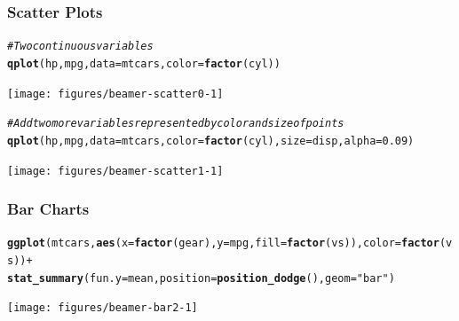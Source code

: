 \documentclass{beamer}\usepackage[]{graphicx}\usepackage[]{color}
\makeatletter
\newcommand{\hlnum}[1]{\textcolor[rgb]{0.686,0.059,0.569}{#1}}%
\newcommand{\hlstr}[1]{\textcolor[rgb]{0.192,0.494,0.8}{#1}}%
\newcommand{\hlcom}[1]{\textcolor[rgb]{0.678,0.584,0.686}{\textit{#1}}}%
\newcommand{\hlopt}[1]{\textcolor[rgb]{0,0,0}{#1}}%
\newcommand{\hlstd}[1]{\textcolor[rgb]{0.345,0.345,0.345}{#1}}%
\newcommand{\hlkwc}[1]{\textcolor[rgb]{0.333,0.667,0.333}{#1}}%
\newcommand{\hlkwd}[1]{\textcolor[rgb]{0.737,0.353,0.396}{\textbf{#1}}}%
\newenvironment{kframe}{%
 \def\at@end@of@kframe{}%
 \ifinner\ifhmode%
  \def\at@end@of@kframe{\end{minipage}}%
  \begin{minipage}{\columnwidth}%
 \fi\fi%
 \def\FrameCommand##1{\hskip\@totalleftmargin \hskip-\fboxsep
 \colorbox{shadecolor}{##1}\hskip-\fboxsep
     \hskip-\linewidth \hskip-\@totalleftmargin \hskip\columnwidth}%
 \MakeFramed {\advance\hsize-\width
   \@totalleftmargin\z@ \linewidth\hsize
   \@setminipage}}%
 {\par\unskip\endMakeFramed%
 \at@end@of@kframe}
\newenvironment{knitrout}{}{} %
\makeatother
\begin{document}
\begin{frame}
\frametitle{Scatter Plots}

\begin{knitrout}\scriptsize
{}\color{fgcolor}\begin{kframe}
\begin{alltt}
\hlcom{# Two continuous variables}
\hlkwd{qplot}\hlstd{(hp, mpg,} \hlkwc{data} \hlstd{= mtcars,} \hlkwc{color} \hlstd{=} \hlkwd{factor}\hlstd{(cyl))}
\end{alltt}
\end{kframe}

{\centering \texttt{[image: figures/beamer-scatter0-1]} 

}



\end{knitrout}

\begin{knitrout}\scriptsize
{}\color{fgcolor}\begin{kframe}
\begin{alltt}
\hlcom{# Add two more variables represented by color and size of points}
\hlkwd{qplot}\hlstd{(hp, mpg,} \hlkwc{data} \hlstd{= mtcars,} \hlkwc{color} \hlstd{=} \hlkwd{factor}\hlstd{(cyl),} \hlkwc{size} \hlstd{= disp,} \hlkwc{alpha} \hlstd{=} \hlnum{0.09}\hlstd{)}
\end{alltt}
\end{kframe}

{\centering \texttt{[image: figures/beamer-scatter1-1]} 

}



\end{knitrout}


\end{frame}

\begin{frame}
\frametitle{Bar Charts}

\begin{knitrout}\scriptsize
{}\color{fgcolor}\begin{kframe}
\begin{alltt}
\hlkwd{ggplot}\hlstd{(mtcars,} \hlkwd{aes}\hlstd{(}\hlkwc{x} \hlstd{=} \hlkwd{factor}\hlstd{(gear),} \hlkwc{y} \hlstd{= mpg,} \hlkwc{fill} \hlstd{=} \hlkwd{factor}\hlstd{(vs)),} \hlkwc{color} \hlstd{=} \hlkwd{factor}\hlstd{(vs))} \hlopt{+}
    \hlkwd{stat_summary}\hlstd{(}\hlkwc{fun.y} \hlstd{= mean,} \hlkwc{position} \hlstd{=} \hlkwd{position_dodge}\hlstd{(),} \hlkwc{geom} \hlstd{=} \hlstr{"bar"}\hlstd{)}
\end{alltt}
\end{kframe}

{\centering \texttt{[image: figures/beamer-bar2-1]} 

}



\end{knitrout}

\end{frame}
\end{document}

